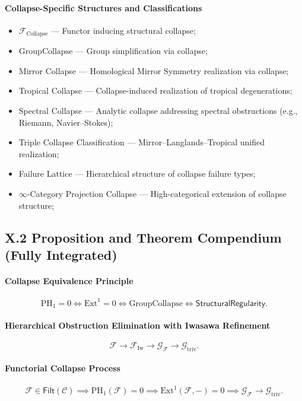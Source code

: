 \documentclass[11pt]{article}
\begin{document}
\paragraph{Collapse-Specific Structures and Classifications}
\begin{itemize}
    \item $\mathcal{F}_{\mathrm{Collapse}}$ — Functor inducing structural collapse;
    \item $\mathrm{GroupCollapse}$ — Group simplification via collapse;
    \item Mirror Collapse — Homological Mirror Symmetry realization via collapse;
    \item Tropical Collapse — Collapse-induced realization of tropical degenerations;
    \item Spectral Collapse — Analytic collapse addressing spectral obstructions (e.g., Riemann, Navier–Stokes);
    \item Triple Collapse Classification — Mirror–Langlands–Tropical unified realization;
    \item Failure Lattice — Hierarchical structure of collapse failure types;
    \item $\infty$-Category Projection Collapse — High-categorical extension of collapse structure;
\end{itemize}

\subsection*{X.2 Proposition and Theorem Compendium (Fully Integrated)}

\paragraph{Collapse Equivalence Principle}
\[
\mathrm{PH}_1 = 0 \iff \mathrm{Ext}^1 = 0 \iff \mathrm{GroupCollapse} \iff \mathsf{StructuralRegularity}.
\]

\paragraph{Hierarchical Obstruction Elimination with Iwasawa Refinement}
\[
\mathcal{F} \longrightarrow \mathcal{F}_{\mathrm{Iw}} \longrightarrow \mathcal{G}_{\mathcal{F}} \longrightarrow \mathcal{G}_{\mathrm{triv}}.
\]

\paragraph{Functorial Collapse Process}
\[
\mathcal{F} \in \mathsf{Filt}(\mathcal{C}) \implies
\mathrm{PH}_1(\mathcal{F}) = 0 \implies \mathrm{Ext}^1(\mathcal{F}, -) = 0 \implies \mathcal{G}_{\mathcal{F}} \longrightarrow \mathcal{G}_{\mathrm{triv}}.
\]
\end{document}
